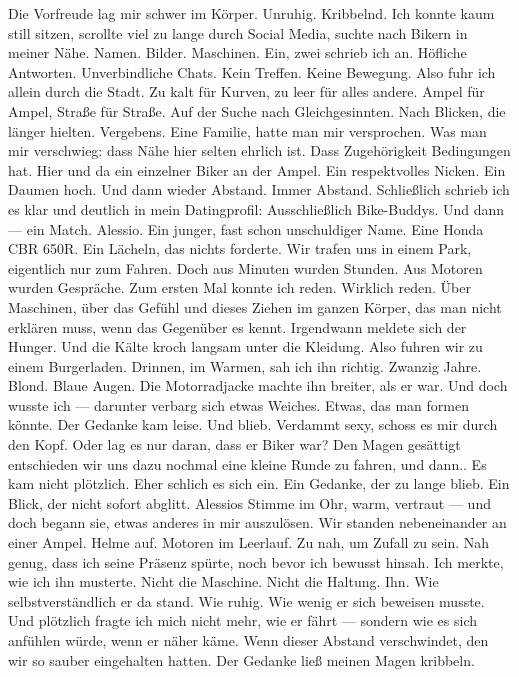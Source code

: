 Die Vorfreude lag mir schwer im Körper. Unruhig. Kribbelnd.
Ich konnte kaum still sitzen, scrollte viel zu lange durch Social Media, suchte nach Bikern in meiner Nähe. Namen. Bilder. Maschinen. Ein, zwei schrieb ich an. Höfliche Antworten. Unverbindliche Chats. Kein Treffen. Keine Bewegung.
Also fuhr ich allein durch die Stadt. Zu kalt für Kurven, zu leer für alles andere. Ampel für Ampel, Straße für Straße. Auf der Suche nach Gleichgesinnten. Nach Blicken, die länger hielten.
Vergebens.
Eine Familie, hatte man mir versprochen.
Was man mir verschwieg: dass Nähe hier selten ehrlich ist. Dass Zugehörigkeit Bedingungen hat.
Hier und da ein einzelner Biker an der Ampel. Ein respektvolles Nicken. Ein Daumen hoch. Und dann wieder Abstand. Immer Abstand.
Schließlich schrieb ich es klar und deutlich in mein Datingprofil:
Ausschließlich Bike-Buddys.
Und dann — ein Match.
Alessio.
Ein junger, fast schon unschuldiger Name. Eine Honda CBR 650R. Ein Lächeln, das nichts forderte.
Wir trafen uns in einem Park, eigentlich nur zum Fahren. Doch aus Minuten wurden Stunden. Aus Motoren wurden Gespräche.
Zum ersten Mal konnte ich reden. Wirklich reden. Über Maschinen, über das Gefühl und dieses Ziehen im ganzen Körper, das man nicht erklären muss, wenn das Gegenüber es kennt.
Irgendwann meldete sich der Hunger. Und die Kälte kroch langsam unter die Kleidung. Also fuhren wir zu einem Burgerladen.
Drinnen, im Warmen, sah ich ihn richtig.
Zwanzig Jahre. Blond. Blaue Augen.
Die Motorradjacke machte ihn breiter, als er war. Und doch wusste ich — darunter verbarg sich etwas Weiches. Etwas, das man formen könnte.
Der Gedanke kam leise. Und blieb.
Verdammt sexy, schoss es mir durch den Kopf.
Oder lag es nur daran, dass er Biker war?
Den Magen gesättigt entschieden wir uns dazu nochmal eine kleine Runde zu fahren, und dann..
Es kam nicht plötzlich.
Eher schlich es sich ein.
Ein Gedanke, der zu lange blieb. Ein Blick, der nicht sofort abglitt.
Alessios Stimme im Ohr, warm, vertraut — und doch begann sie, etwas anderes in mir auszulösen.
Wir standen nebeneinander an einer Ampel. Helme auf. Motoren im Leerlauf.
Zu nah, um Zufall zu sein. Nah genug, dass ich seine Präsenz spürte, noch bevor ich bewusst hinsah.
Ich merkte, wie ich ihn musterte. Nicht die Maschine. Nicht die Haltung.
Ihn.
Wie selbstverständlich er da stand. Wie ruhig. Wie wenig er sich beweisen musste.
Und plötzlich fragte ich mich nicht mehr, wie er fährt —
sondern wie es sich anfühlen würde, wenn er näher käme. Wenn dieser Abstand verschwindet, den wir so sauber eingehalten hatten.
Der Gedanke ließ meinen Magen kribbeln.
